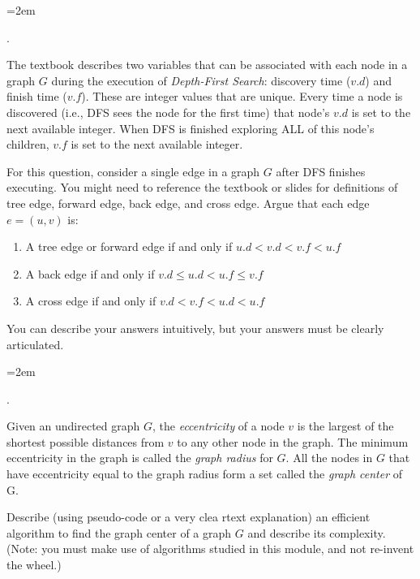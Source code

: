 \documentclass[12pt]{article}
\newcounter{quesnum}
\newcommand{\question}[2][??]{
\begin{list}{\labelitemi}{\leftmargin=2em}
\item [\arabic{quesnum}.] {#2}
\end{list}
\addtocounter{quesnum}{1}
}
\begin{document}
\question[1]{
The textbook describes two variables that can be associated with each node in a graph $G$ during the execution of \emph{Depth-First Search}: discovery time ($v.d$) and finish time ($v.f$). These are integer values that are unique. Every time a node is discovered (i.e., DFS sees the node for the first time) that node's $v.d$ is set to the next available integer. When DFS is finished exploring ALL of this node's children, $v.f$ is set to the next available integer.

For this question, consider a single edge in a graph $G$ after DFS finishes executing. You might need to reference the textbook or slides for definitions of tree edge, forward edge, back edge, and cross edge. Argue that each edge $e=(u,v)$ is:

\begin{enumerate}
\item A tree edge or forward edge if and only if $u.d < v.d < v.f < u.f$
\item A back edge if and only if $v.d \leq u.d < u.f \leq v.f$
\item A cross edge if and only if $v.d < v.f < u.d < u.f$
\end{enumerate}

You can describe your answers intuitively, but your answers must be clearly articulated.
}



\question[1]{
Given an undirected graph $G$, the {\em eccentricity} of a node $v$ is the largest of the shortest possible distances from $v$ to any other node in the graph. The minimum eccentricity in the graph is called the  {\em graph radius} for $G$. All the nodes in $G$ that have eccentricity equal to the graph radius form a set called the {\em graph center} of G.

Describe (using pseudo-code or a very clea rtext explanation) an efficient algorithm to find the graph center of a graph $G$ and describe its complexity.  (Note: you must make use of algorithms studied in this module, and not  re-invent the wheel.)
}
\fi
\end{document}
